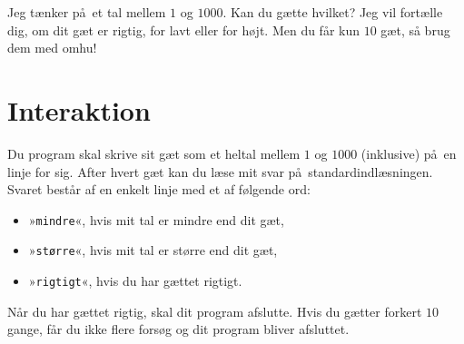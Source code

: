 
Jeg tænker på et tal mellem $1$ og $1000$.
Kan du gætte hvilket?
Jeg vil fortælle dig, om dit gæt er rigtig, for lavt eller for højt.
Men du får kun $10$ gæt, så brug dem med omhu!

\section*{Interaktion}

Du program skal skrive sit gæt som et heltal mellem $1$ og $1000$ (inklusive) på en linje for sig.
After hvert gæt kan du læse mit svar på standardindlæsningen.
Svaret består af en enkelt linje med et af følgende ord:
\begin{itemize}
\item »\texttt{mindre}«, hvis mit tal er mindre end dit gæt,
\item »\texttt{større}«, hvis mit tal er større end dit gæt,
\item »\texttt{rigtigt}«, hvis du har gættet rigtigt.
\end{itemize}
Når du har gættet rigtig, skal dit program afslutte.
Hvis du gætter forkert $10$ gange, får du ikke flere forsøg og dit program bliver afsluttet.

